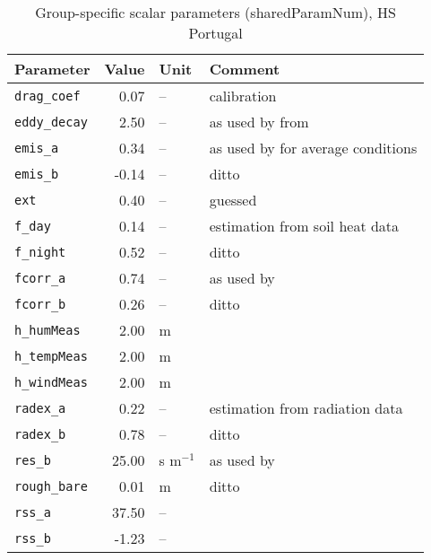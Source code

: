 \begin{table}[ht]
\centering
\caption{Group-specific scalar parameters (\textsf{sharedParamNum}), HS Portugal} 
\label{tab:portugalHS_sharedParamNum}
\begin{tabular}{lrll}
  \hline
Parameter & Value & Unit & Comment \\ 
  \hline
\verb!drag_coef! & 0.07 & -- & calibration \\ 
  \verb!eddy_decay! & 2.50 & -- & as used by \citet{shuttleworth85} from \citet{monteith73} \\ 
  \verb!emis_a! & 0.34 & -- & as used by \citet{maidment93} for average conditions \\ 
  \verb!emis_b! & -0.14 & -- & ditto \\ 
  \verb!ext! & 0.40 & -- & guessed \\ 
  \verb!f_day! & 0.14 & -- & estimation from soil heat data \\ 
  \verb!f_night! & 0.52 & -- & ditto \\ 
  \verb!fcorr_a! & 0.74 & -- & as used by \citet{maidment93} \\ 
  \verb!fcorr_b! & 0.26 & -- & ditto \\ 
  \verb!h_humMeas! & 2.00 & m &  \\ 
  \verb!h_tempMeas! & 2.00 & m &  \\ 
  \verb!h_windMeas! & 2.00 & m &  \\ 
  \verb!radex_a! & 0.22 & -- & estimation from radiation data \\ 
  \verb!radex_b! & 0.78 & -- & ditto \\ 
  \verb!res_b! & 25.00 & s m$^{-1}$ & as used by \citet{shuttleworth85} \\ 
  \verb!rough_bare! & 0.01 & m & ditto \\ 
  \verb!rss_a! & 37.50 & -- &  \\ 
  \verb!rss_b! & -1.23 & -- &  \\ 
   \hline
\end{tabular}
\end{table}
